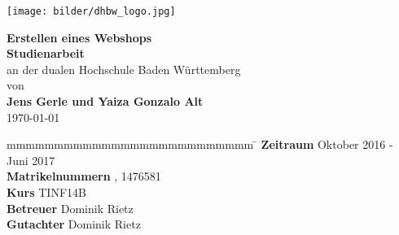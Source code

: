 \begin{titlepage}
	\centering
	\texttt{[image: bilder/dhbw\_logo.jpg]}
	\enlargethispage{20mm}
	\begin{center}
		\vspace*{12mm}	{\LARGE\textbf{Erstellen eines Webshops} }\\
		\vspace*{12mm}	{\large\textbf{Studienarbeit}}\\
		\vspace*{3mm}	an der dualen Hochschule Baden Württemberg\\
		\vspace*{3mm}	von\\
		\vspace*{3mm}	{\large\textbf{Jens Gerle und Yaiza Gonzalo Alt}}\\
		\vspace*{12mm}	\today\\
	\end{center}
	\vspace*{65mm}
	\begin{spacing}{1.2}
		\begin{tabbing}
			mmmmmmmmmmmmmmmmmmmmmmmmmm             \= \kill
			\textbf{Zeitraum}       			\>  Oktober 2016 - Juni 2017\\
			\textbf{Matrikelnummern}			, 1476581\\
			\textbf{Kurs}  						\>  TINF14B\\
			\textbf{Betreuer}       			\>  Dominik Rietz\\
			\textbf{Gutachter}      			\>  Dominik Rietz
		\end{tabbing}
	\end{spacing}
\end{titlepage}